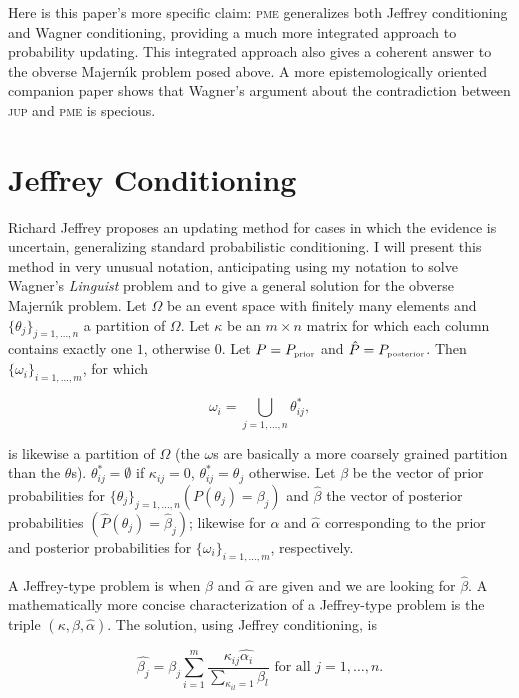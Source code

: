 \documentclass[11pt]{article}
\begin{document}
Here is this paper's more specific claim: \textsc{pme} generalizes
both Jeffrey conditioning and Wagner conditioning, providing a much
more integrated approach to probability updating. This integrated
approach also gives a coherent answer to the obverse Majern{\'\i}k problem
posed above. A more epistemologically oriented companion paper shows
that Wagner's argument about the contradiction between \textsc{jup}
and \textsc{pme} is specious.

\section{Jeffrey Conditioning}
\label{jc}

Richard Jeffrey proposes an updating method for cases in which the
evidence is uncertain, generalizing standard probabilistic
conditioning. I will present this method in very unusual notation,
anticipating using my notation to solve Wagner's \emph{Linguist}
problem and to give a general solution for the obverse Majern{\'\i}k
problem. Let $\Omega$ be an event space with finitely many elements
and $\{\theta_{j}\}_{j=1,\ldots,n}$ a partition of $\Omega$. Let
$\kappa$ be an $m\times{}n$ matrix for which each column contains
exactly one $1$, otherwise $0$. Let $P=P_{\mbox{\tiny{prior}}}$ and
$\hat{P}=P_{\mbox{\tiny{posterior}}}$. Then
$\{\omega_{i}\}_{i=1,\ldots,m}$, for which

\begin{equation}
  \label{eq:m1}
  \omega_{i}=\bigcup_{j=1,\dots,n}\theta^{*}_{ij},
\end{equation}

is likewise a partition of $\Omega$ (the $\omega$s are basically a
more coarsely grained partition than the $\theta$s).
$\theta^{*}_{ij}=\emptyset$ if $\kappa_{ij}=0$,
$\theta^{*}_{ij}=\theta_{j}$ otherwise. Let $\beta$ be the vector of
prior probabilities for $\{\theta_{j}\}_{j=1,\ldots,n}
(P(\theta_{j})=\beta_{j})$ and $\hat{\beta}$ the vector of posterior
probabilities $(\hat{P}(\theta_{j})=\hat{\beta}_{j})$; likewise for
$\alpha$ and $\hat{\alpha}$ corresponding to the prior and posterior
probabilities for $\{\omega_{i}\}_{i=1,\ldots,m}$, respectively.

A Jeffrey-type problem is when $\beta$ and $\hat{\alpha}$ are given
and we are looking for $\hat{\beta}$. A mathematically more concise
characterization of a Jeffrey-type problem is the triple
$(\kappa,\beta,\hat{\alpha})$. The solution, using Jeffrey
conditioning, is

\begin{equation}
  \label{eq:m2}
  \hat{\beta_{j}}=\beta_{j}\sum_{i=1}^{m}\frac{\kappa_{ij}\hat{\alpha_{i}}}{\sum_{\kappa_{il}=1}\beta_{l}}\mbox{ for all }j=1,\ldots,n.
\end{equation}
\end{document}
